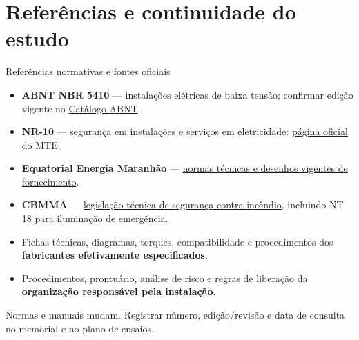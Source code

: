 
\section{Referências e continuidade do estudo}

\begin{frame}{Referências normativas e fontes oficiais}
\small
\begin{itemize}
\item \textbf{ABNT NBR 5410} — instalações elétricas de baixa tensão; confirmar edição vigente no \href{https://www.abntcatalogo.com.br/}{Catálogo ABNT}.
\item \textbf{NR-10} — segurança em instalações e serviços em eletricidade: \href{https://www.gov.br/trabalho-e-emprego/pt-br/acesso-a-informacao/participacao-social/conselhos-e-orgaos-colegiados/comissao-tripartite-partitaria-permanente/normas-regulamentadora/normas-regulamentadoras-vigentes/norma-regulamentadora-no-10-nr-10}{página oficial do MTE}.
\item \textbf{Equatorial Energia Maranhão} — \href{https://ma.equatorialenergia.com.br/institucional/leis-e-normas-tecnicas/normas-tecnicas/instalacao-de-padrao/}{normas técnicas e desenhos vigentes de fornecimento}.
\item \textbf{CBMMA} — \href{https://cbm.ssp.ma.gov.br/unidades-bm/unidades-administrativas/dat/legislacao-tecnica-dat/}{legislação técnica de segurança contra incêndio}, incluindo NT 18 para iluminação de emergência.
\item Fichas técnicas, diagramas, torques, compatibilidade e procedimentos dos \textbf{fabricantes efetivamente especificados}.
\item Procedimentos, prontuário, análise de risco e regras de liberação da \textbf{organização responsável pela instalação}.
\end{itemize}
\begin{caixaAt}
Normas e manuais mudam. Registrar número, edição/revisão e data de consulta no memorial e no plano de ensaios.
\end{caixaAt}
\end{frame}

